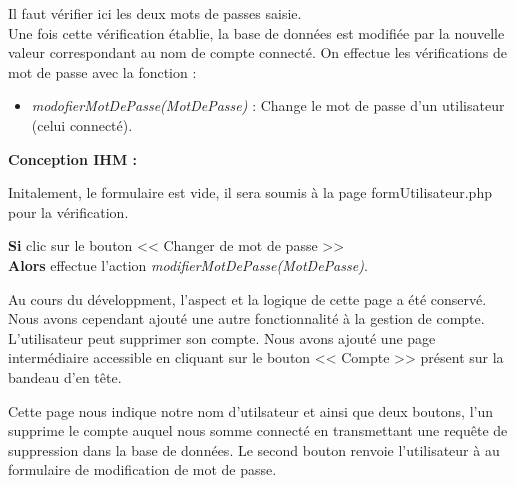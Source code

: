 			\begin{paragraphe}
                Il faut vérifier ici les deux mots de passes saisie. \\
                Une fois cette vérification établie, la base de données est modifiée par la nouvelle valeur correspondant au nom de compte connecté.
				On effectue les vérifications de mot de passe avec la fonction :
				\begin{itemize}
					\item \emph{modofierMotDePasse(MotDePasse)} : Change le mot de passe d'un utilisateur (celui connecté).
				\end{itemize}
			\end{paragraphe}

			\begin{paragraphe}
				\textbf{Conception IHM :}
			\end{paragraphe}

			\begin{paragraphe}
				Initalement, le formulaire est vide, il sera soumis à la page formUtilisateur.php pour la vérification.
			\end{paragraphe}


			\begin{paragraphe}
				\textbf{Si} clic sur le bouton << Changer de mot de passe >> \\
				\textbf{Alors} effectue l'action \emph{modifierMotDePasse(MotDePasse)}.
			\end{paragraphe}

        \newpage
        
            \begin{paragraphe}
               Au cours du développment, l'aspect et la logique de cette page a été conservé. Nous avons cependant ajouté une autre fonctionnalité
               à la gestion de compte. L'utilisateur peut supprimer son compte. Nous avons ajouté une page intermédiaire accessible en cliquant sur le bouton
               << Compte >> présent sur la bandeau d'en tête.
            \end{paragraphe}
               
            \begin{paragraphe}
                Cette page nous indique notre nom d'utilsateur et ainsi que deux boutons, l'un supprime le compte auquel nous somme connecté en transmettant une requête de suppression dans la
                base de données. Le second bouton renvoie l'utilisateur à au formulaire de modification de mot de passe.
            \end{paragraphe}

